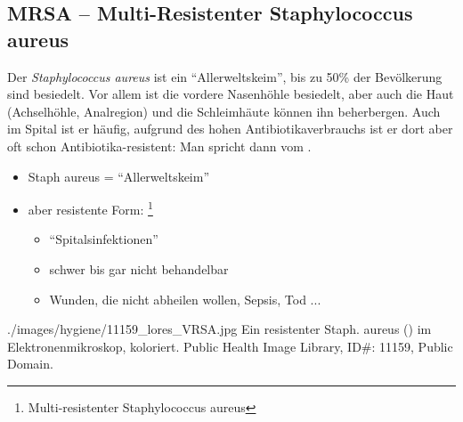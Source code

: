 \begin{minipage}{13.67cm}


\end{minipage}

\subsection{MRSA -- Multi-Resistenter Staphylococcus
aureus} 



{%
Der \emph{Staphylococcus aureus} ist ein "`Allerweltskeim"', bis zu 50\% der
Bevölkerung sind besiedelt. Vor allem ist die vordere Nasenhöhle besiedelt, aber
auch die Haut (Achselhöhle, Analregion) und die Schleimhäute können ihn
beherbergen. Auch im Spital ist er häufig, aufgrund des hohen
Antibiotikaverbrauchs ist er dort aber oft schon Antibiotika-resistent: Man
spricht dann vom .
}{
\begin{itemize}
    \item Staph aureus = "`Allerweltskeim"'
    \item aber resistente Form:
    \footnote{Multi-resistenter Staphylococcus aureus}
    \begin{itemize}
        \item {\textquotedblleft}Spitalsinfektionen{\textquotedblright}
        \item schwer bis gar nicht behandelbar
        \item Wunden, die nicht abheilen wollen, Sepsis, Tod ...
    \end{itemize}
\end{itemize}
}
{./images/hygiene/11159_lores_VRSA.jpg}
{Ein
resistenter Staph. aureus () im Elektronenmikroskop,
koloriert.}
{Public Health Image Library, ID\#: 11159, Public Domain.}





